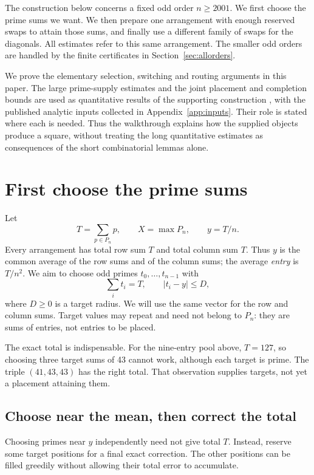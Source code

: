 \documentclass[11pt]{article}
\theoremstyle{definition}
\begin{document}
The construction below concerns a fixed odd order \(n\ge2001\). We first choose
the prime sums we want. We then prepare one arrangement with enough reserved
swaps to attain those sums, and finally use a different family of swaps for
the diagonals. All estimates refer to this same arrangement. The smaller odd
orders are handled by the finite certificates in Section~\ref{sec:allorders}.

We prove the elementary selection, switching and routing arguments in this
paper. The large prime-supply estimates and the joint placement and completion
bounds are used as quantitative results of the supporting construction
\cite[Sections 3--4]{Companion}, with the published analytic inputs collected
in Appendix~\ref{app:inputs}. Their role is stated where each is needed.
Thus the walkthrough explains how the supplied objects produce a square,
without treating the long quantitative estimates as consequences of the
short combinatorial lemmas alone.

\section{First choose the prime sums}\label{sec:targets}

Let
\[
 T=\sum_{p\in P_n}p,\qquad X=\max P_n,\qquad y=T/n.
\]
Every arrangement has total row sum \(T\) and total column sum \(T\). Thus \(y\)
is the common average of the row sums and of the column sums; the average
\emph{entry} is \(T/n^2\). We aim to choose odd primes \(t_0,\ldots,t_{n-1}\)
with
\begin{equation}\label{eq:targets}
 \sum_i t_i=T,\qquad |t_i-y|\le D,
\end{equation}
where \(D\ge0\) is a target radius. We will use the same vector for the row and
column sums. Target values may repeat and need not belong to \(P_n\): they
are sums of entries, not entries to be placed.

The exact total is indispensable. For the nine-entry pool above, \(T=127\),
so choosing three target sums of 43 cannot work, although each target is prime.
The triple \((41,43,43)\) has the right total. That observation supplies targets,
not yet a placement attaining them.

\subsection{Choose near the mean, then correct the total}

Choosing primes near \(y\) independently need not give total \(T\). Instead,
reserve some target positions for a final exact correction. The other positions
can be filled greedily without allowing their total error to accumulate.
\end{document}
